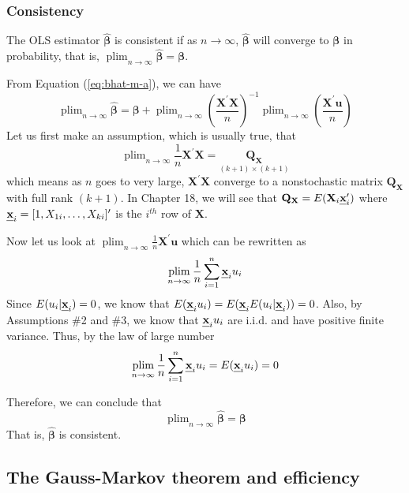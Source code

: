 \documentclass[a4paper,11pt]{article}
\DeclareMathOperator*{\plim}{plim}
\def\mathbi#1{\textbf{\em #1}}
\begin{document}
\subsubsection*{Consistency}
\label{sec:org14b8f06}

The OLS estimator \(\hat{\boldsymbol{\beta}}\) is consistent if as \(n
\rightarrow \infty\), \(\hat{\boldsymbol{\beta}}\) will converge to
\(\boldsymbol{\beta}\) in probability, that is, \(\plim_{n \rightarrow
\infty} \hat{\boldsymbol{\beta}} = \boldsymbol{\beta}\).

From Equation (\ref{eq:bhat-m-a}), we can have
\begin{equation*}
\plim_{n \rightarrow \infty} \hat{\boldsymbol{\beta}} = \boldsymbol{\beta} + \plim_{n \rightarrow \infty} \left(\frac{\mathbf{X}^{\prime} \mathbf{X}}{n} \right)^{-1} \plim_{n \rightarrow \infty}\left( \frac{\mathbf{X}^{\prime} \mathbf{u}}{n} \right)
\end{equation*}
Let us first  make an assumption, which is usually true, that
\begin{equation}
\label{eq:plim-bhat-m}
 \plim_{n \rightarrow \infty} \frac{1}{n} \mathbf{X}^{\prime}
\mathbf{X} = \underset{(k+1) \times (k+1)}{\mathbf{Q_X}}
\end{equation}
which means as \(n\) goes to very large, \(\mathbf{X}^{\prime}
\mathbf{X}\) converge to a nonstochastic matrix \(\mathbf{Q_X}\) with
full rank \((k + 1)\). In Chapter 18, we will see that \(\mathbf{Q_X} =
E(\mathbf{X}_i \mathbi{x}_i^{\prime})\) where \(\mathbi{x}_i = [1,
X_{1i}, \ldots, X_{ki}]^{\prime}\) is the \(i^{th}\) row of
\(\mathbf{X}\).

Now let us look at \(\plim_{n \rightarrow \infty} \frac{1}{n}
\mathbf{X}^{\prime} \mathbf{u}\) which can be rewritten as
\[ \plim_{n \rightarrow \infty} \frac{1}{n} \sum_{i=1}^n \mathbi{x}_i
u_i \]
Since \(E(u_i | \mathbi{x}_i) = 0\), we know that \(E(\mathbi{x}_i u_i) =
E(\mathbi{x}_iE(u_i | \mathbi{x}_i)) = 0\). Also, by Assumptions \#2 and
\#3, we know that \(\mathbi{x}_i u_i\) are i.i.d. and have positive
finite variance. Thus, by the law of large number
\[ \plim_{n \rightarrow  \infty} \frac{1}{n} \sum_{i=1}^n \mathbi{x}_i u_i = E(\mathbi{x}_i
u_i) = 0 \]

Therefore, we can conclude that
\[ \plim_{n \rightarrow \infty} \hat{\boldsymbol{\beta}} = \boldsymbol{\beta}  \]
That is, \(\hat{\boldsymbol{\beta}}\) is consistent.


\subsection{The Gauss-Markov theorem and efficiency}
\label{sec:orgc8dc76a}
\end{document}
